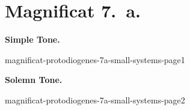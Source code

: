 {
\cleartoleftpage{}
\thispagestyle{empty}
\newcommand{\printsimpletone}{
\needspace{3\baselineskip}
\begin{center}\textbf{Simple Tone.}\end{center}
\vspace{0ex plus 0ex minus 2ex}
}
\newcommand{\printsolemntone}{
\needspace{3\baselineskip}
\begin{center}\textbf{Solemn Tone.}\end{center}
\vspace{0ex plus 0ex minus 1ex}
}

\label{magnificat-7a}
\vspace*{-\headheight}
\vspace*{-0.5\baselineskip}
\section{Magnificat 7.~a.}

\vspace{-\baselineskip}
\def\betweenLilyPondSystem#1{
  \ifnum#1>1
    \vfil\noindent
  \else
    \linebreak
  \fi
}
\newcommand{\includelilypond}[1]{
  \noindent
  {#1}
}
\def\magsolemn{F}
\def\magprotodiogenes{T}
\def\annot{\magtone.~\magend}
\printsimpletone{}
\begin{boldnummagnificat}{\magtex}
\magverses
\end{boldnummagnificat}


\vfill
\includelilypond{magnificat-protodiogenes-7a-small-systems-page1}
\pagebreak


\def\magsolemn{T}
\let\magant=\undefined
\let\magantlinetwo=\undefined
\let\magtex=\undefined
\let\magverses=\undefined
\def\magprotodiogenes{T}
\def\annot{\magtone.~\magend}
\printsolemntone{}
\begin{boldnummagnificat}{\magtex}
\magverses
\end{boldnummagnificat}


\vfill
\includelilypond{magnificat-protodiogenes-7a-small-systems-page2}
}